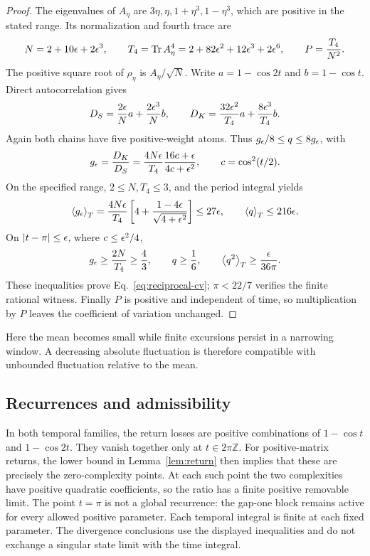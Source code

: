 \begin{proof}
The eigenvalues of $A_\eta$ are $3\eta,\eta,1+\eta^3,1-\eta^3$,
which are positive in the stated range. Its normalization and fourth trace
are
\begin{equation}\label{eq:reciprocal-traces}
 N=2+10\epsilon+2\epsilon^3,\qquad
 T_4=\operatorname{Tr} A_\eta^4=2+82\epsilon^2+12\epsilon^3+2\epsilon^6,
 \qquad P=\frac{T_4}{N^2}.
\end{equation}
The positive square root of $\rho_\eta$ is $A_\eta/\sqrt N$. Write
$a=1-\cos2t$ and $b=1-\cos t$. Direct autocorrelation gives
\begin{equation}\label{eq:reciprocal-losses}
 D_S=\frac{2\epsilon}{N}a+\frac{2\epsilon^3}{N}b,\qquad
 D_K=\frac{32\epsilon^2}{T_4}a+\frac{8\epsilon^3}{T_4}b.
\end{equation}
Again both chains have five positive-weight atoms. Thus
$g_\epsilon/8\le q\le8g_\epsilon$, with
\begin{equation}\label{eq:reciprocal-g}
 g_\epsilon=\frac{D_K}{D_S}
 =\frac{4N\epsilon}{T_4}\frac{16c+\epsilon}{4c+\epsilon^2},
 \qquad c=\cos^2(t/2).
\end{equation}
On the specified range, $2\le N,T_4\le3$, and the period integral yields
\begin{equation}\label{eq:reciprocal-mean}
 \left\langle g_\epsilon\right\rangle_T=\frac{4N\epsilon}{T_4}
 \left[4+\frac{1-4\epsilon}{\sqrt{4+\epsilon^2}}\right]
 \le27\epsilon,\qquad \left\langle q\right\rangle_T\le216\epsilon.
\end{equation}
On $|t-\pi|\le\epsilon$, where $c\le\epsilon^2/4$,
\begin{equation}\label{eq:reciprocal-window}
 g_\epsilon\ge\frac{2N}{T_4}\ge\frac43,\qquad
 q\ge\frac16,\qquad \left\langle q^2\right\rangle_T\ge\frac{\epsilon}{36\pi}.
\end{equation}
These inequalities prove Eq.~\eqref{eq:reciprocal-cv}; $\pi<22/7$ verifies
the finite rational witness. Finally $P$ is positive and independent of
time, so multiplication by $P$ leaves the coefficient of variation unchanged.
\end{proof}

Here the mean becomes small while finite excursions persist in a narrowing
window. A decreasing absolute fluctuation is therefore compatible with
unbounded fluctuation relative to the mean.

\subsection{Recurrences and admissibility}
In both temporal families, the return losses are positive combinations of
$1-\cos t$ and $1-\cos2t$. They vanish together only at
$t\in2\pi\mathbb Z$. For positive-matrix returns, the lower bound in
Lemma~\ref{lem:return} then implies that these are precisely the
zero-complexity points. At each such point the two complexities have
positive quadratic coefficients, so the ratio has a finite positive
removable limit. The point $t=\pi$ is not a global recurrence: the gap-one
block remains active for every allowed positive parameter. Each temporal
integral is finite at each fixed parameter. The divergence conclusions use
the displayed inequalities and do not exchange a singular state limit
with the time integral.

